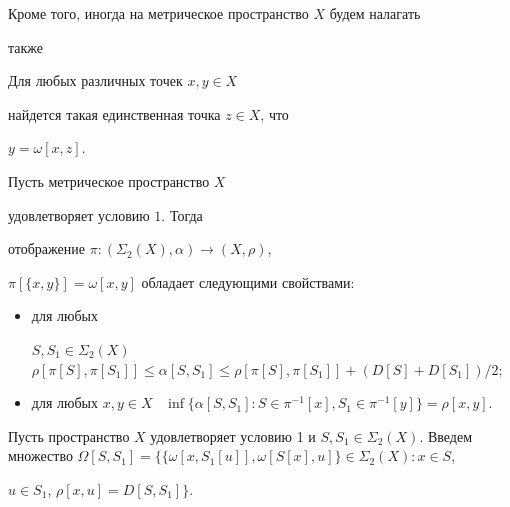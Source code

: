 Кроме того, иногда на метрическое пространство $X$ будем налагать


также 





\begin{cond}


Для любых различных точек $x, y \in X$


найдется такая единственная точка $z \in X$, что


$y = \omega [x,z]$.


\end{cond}





\begin{lem}


Пусть метрическое пространство $X$


удовлетворяет условию $1$. Тогда


отображение $\pi : (\Sigma_{2} (X),\alpha) \rightarrow (X,\rho)$,


$\pi [\{x,y\}] = \omega [x,y]$ обладает следующими свойствами\/${:}$


\begin{itemize}


\item[(i)] для любых


$S,S_{1} \in \Sigma_{2} (X)$ \ $\rho [\pi [S],\pi


[S_{1}]] \leq \alpha [S,S_{1}] \leq \rho[\pi [S],\pi [S_{1}]] +


(D[S] + D[S_{1}])/2;$


\item[(ii)] для любых $x,y \in X$ \ $\inf \{\alpha [S,S_{1}] : S \in


\pi^{-1}[x], S_{1} \in \pi^{-1}[y]\} = \rho [x,y]$.


\end{itemize}


\end{lem}





Пусть пространство $X$ удовлетворяет условию 1 и $S, S_{1} \in


\Sigma_{2}(X)$. Введем множество $\Omega [S,S_{1}] = \{\{\omega


[x,S_{1}[u]],\omega [S[x],u]\} \in \Sigma_{2}(X) : x \in S$,


$u\in S_{1}$, $\rho [x,u] = D[S,S_{1}] \}$.





